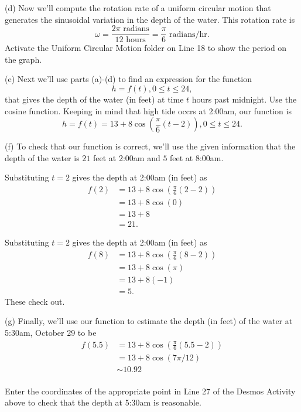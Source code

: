 \documentclass{ximera}
\begin{document}
\begin{example}
\begin{explanation}
(d) Now we'll compute the rotation rate of a uniform circular motion that generates the sinusoidal variation in the depth of the water. This rotation rate is
\[
  \omega = \frac{2\pi \text{ radians}}{12 \text{ hours}} = \frac{\pi}{6} \text{ radians/hr} .
\]
Activate the Uniform Circular Motion folder on Line 18 to show the period on the graph.

(e) Next we'll use parts (a)-(d) to find an expression for the function 
\[
   h = f(t) ,  0\leq t \leq 24, 
\]
that gives the depth of the water (in feet) at time $t$ hours past midnight. Use the cosine function. Keeping in mind that high tide occrs at 2:00am, our function is 
\[
   h  = f(t) = 13 + 8 \cos \left(  \frac{\pi}{6} \left( t - 2 \right) \right),  0\leq t \leq 24.
\]



(f) To check that our function is correct, we'll use the given information that the depth of the water is $21$ feet at 2:00am and $5$ feet at 8:00am.

Substituting $t=2$ gives the depth at 2:00am (in feet) as
\begin{align*}
   f(2)   & = 13 + 8 \cos \left(  \frac{\pi}{6} \left( 2 - 2 \right) \right) \\ 
           & = 13 + 8 \cos (0)  \\ 
           & = 13 + 8 \\
           & = 21 .
\end{align*}

Substituting $t=2$ gives the depth at 2:00am (in feet) as
\begin{align*}
   f(8)   & = 13 + 8 \cos \left(  \frac{\pi}{6} \left(8 - 2 \right) \right) \\ 
           & = 13 + 8 \cos (\pi)  \\ 
           & = 13 + 8(-1) \\
           & = 5 .
\end{align*}
These check out.

(g) Finally, we'll use our function to estimate the depth (in feet) of the water at 5:30am, October 29 to be
\begin{align*}
   f(5.5)   & = 13 + 8 \cos \left(  \frac{\pi}{6} \left(5.5 - 2 \right) \right) \\ 
           & = 13 + 8 \cos (7\pi / 12)  \\ 
           &  \sim  10.92 \\
         \end{align*}

\begin{question} \label{Qdgtr6y7y}
Enter the coordinates of the appropriate point in Line 27 of the Desmos Activity above to check that the depth at 5:30am is reasonable.
\end{question}
\end{explanation}

\end{example}
\end{document}
